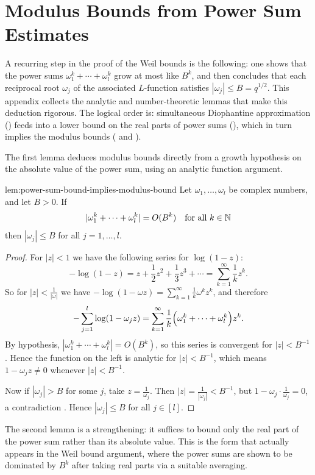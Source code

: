\chapter{Modulus Bounds from Power Sum Estimates}

A recurring step in the proof of the Weil bounds is the following: one shows that the power sums $\omega_1^k + \cdots + \omega_l^k$ grow at most like $B^k$, and then concludes that each reciprocal root $\omega_j$ of the associated $L$-function satisfies $|\omega_j| \leq B = q^{1/2}$. This appendix collects the analytic and number-theoretic lemmas that make this deduction rigorous. The logical order is: simultaneous Diophantine approximation () feeds into a lower bound on the real parts of power sums (), which in turn implies the modulus bounds ( and ).

The first lemma deduces modulus bounds directly from a growth hypothesis on the absolute value of the power sum, using an analytic function argument.

\begin{Lemma}{}{lem:power-sum-bound-implies-modulus-bound}
  Let $\omega_1,\dots,\omega_l$ be complex numbers, and let $B > 0$. If
  \[
    |\omega_1^k + \cdots + \omega_l^k| = O(B^k)
    \quad \text{for all } k\in\mathbb{N}
  \]
  then $|\omega_j| \le B $ for all $j = 1,\dots,l$.
\end{Lemma}
\begin{proof}
  For $|z| < 1$ we have the following series for $\log(1-z)$:
  \[
    -\log(1-z) = z + \frac{1}{2}z^2 + \frac{1}{3}z^3 + \cdots = \sum_{k=1}^{\infty} \frac{1}{k} z^k.
  \]
  So for $|z| < \frac{1}{|\omega|}$ we have $-\log(1-\omega z) = \sum_{k=1}^{\infty} \frac{1}{k}\omega^k z^k$, and therefore
  \[
    -\sum_{j=1}^{l} \log(1 - \omega_j z) = \sum_{k=1}^{\infty} \frac{1}{k}\Bigl(\omega_1^k + \cdots + \omega_l^k\Bigr) z^k.
  \]
  By hypothesis, $|\omega_1^k + \cdots + \omega_l^k| = O(B^k)$, so this series is convergent for $|z| < B^{-1}$. Hence the function on the left is analytic for $|z| < B^{-1}$, which means $1 - \omega_j z \neq 0$ whenever $|z| < B^{-1}$.

  Now if $|\omega_j| > B$ for some $j$, take $z = \frac{1}{\omega_j}$. Then $|z| = \frac{1}{|\omega_j|} < B^{-1}$, but $1 - \omega_j \cdot \frac{1}{\omega_j} = 0$, a contradiction \ctr. Hence $|\omega_j| \leq B$ for all $j \in [l]$.
\end{proof}
The second lemma is a strengthening: it suffices to bound only the real part of the power sum rather than its absolute value. This is the form that actually appears in the Weil bound argument, where the power sums are shown to be dominated by $B^k$ after taking real parts via a suitable averaging.

